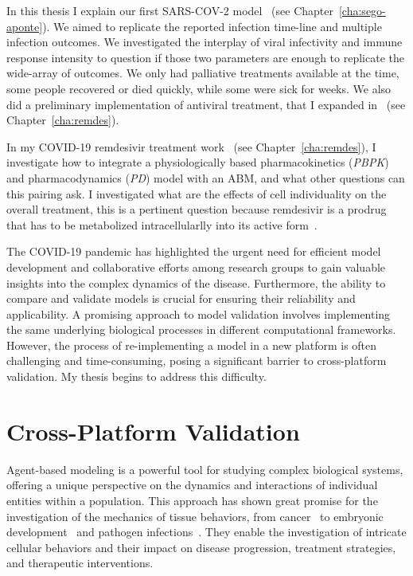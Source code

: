 In this thesis I explain our first SARS-COV-2 model~\cite{sego_modular_2020} (see Chapter~\ref{cha:sego-aponte}). We aimed to replicate the reported infection time-line and multiple infection outcomes. We investigated the interplay of viral infectivity and immune response intensity to question if those two parameters are enough to replicate the wide-array of outcomes. We only had palliative treatments available at the time, some people recovered or died quickly, while some were sick for weeks. We also did a preliminary implementation of antiviral treatment, that I expanded in~\cite{ferrari_gianlupi_multiscale_2022} (see Chapter~\ref{cha:remdes}).

In my COVID-19 remdesivir treatment work~\cite{ferrari_gianlupi_multiscale_2022} (see Chapter~\ref{cha:remdes}), I investigate how to integrate a physiologically based pharmacokinetics (\textit{PBPK}) and pharmacodynamics (\textit{PD}) model with an ABM, and what other questions can this pairing ask. I investigated what are the effects of cell individuality on the overall treatment, this is a pertinent question because remdesivir is a prodrug that has to be metabolized intracellularlly into its active form~\cite{eastman_remdesivir_2020}.

The COVID-19 pandemic has highlighted the urgent need for efficient model development and collaborative efforts among research groups to gain valuable insights into the complex dynamics of the disease. Furthermore, the ability to compare and validate models is crucial for ensuring their reliability and applicability. A promising approach to model validation involves implementing the same underlying biological processes in different computational frameworks. However, the process of re-implementing a model in a new platform is often challenging and time-consuming, posing a significant barrier to cross-platform validation. My thesis begins to address this difficulty.


\section{Cross-Platform Validation}\label{sec:intro:cross}
Agent-based modeling is a powerful tool for studying complex biological systems, offering a unique perspective on the dynamics and interactions of individual entities within a population. This approach has shown great promise for the investigation of the mechanics of tissue behaviors, from cancer~\cite{10.1371/journal.pone.0033726, ozik_high-throughput_2018} to embryonic development~\cite{graner1992simulation,hester2011multi,adhyapok2021mechanical} and pathogen infections~\cite{sego_generation_2021,ferrari_gianlupi_multiscale_2022,sego_modular_2020,sego2022multiscale}. They enable the investigation of intricate cellular behaviors and their impact on disease progression, treatment strategies, and therapeutic interventions. 

